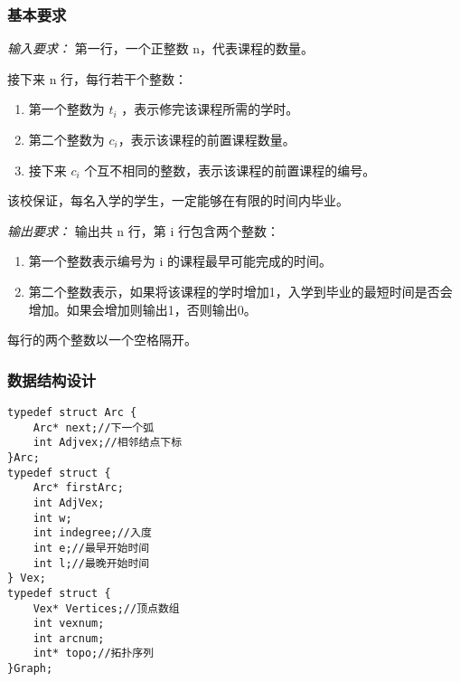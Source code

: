 \documentclass[a4paper,11pt]{article}%
\newenvironment{shadedquotation}
 {\begin{shaded*}
  \quoting[leftmargin=0pt, vskip=0pt]
 }
 {\endquoting
 \end{shaded*}
}
\begin{document}
\subsubsection{基本要求}
\begin{shadedquotation}
    \emph{输入要求：}
    第一行，一个正整数 n，代表课程的数量。

    接下来 n 行，每行若干个整数：
    \begin{enumerate}
        \item 第一个整数为 $t_i$ ，表示修完该课程所需的学时。
        \item 第二个整数为 $c_i$，表示该课程的前置课程数量。
        \item 接下来 $c_i$ 个互不相同的整数，表示该课程的前置课程的编号。
    \end{enumerate}
    该校保证，每名入学的学生，一定能够在有限的时间内毕业。
\end{shadedquotation}
\begin{shadedquotation}
    \emph{输出要求：}
    输出共 n 行，第 i 行包含两个整数：
    \begin{enumerate}
        \item 第一个整数表示编号为 i 的课程最早可能完成的时间。
        \item 第二个整数表示，如果将该课程的学时增加1，入学到毕业的最短时间是否会增加。如果会增加则输出1，否则输出0。
    \end{enumerate}
    每行的两个整数以一个空格隔开。
\end{shadedquotation}
\subsubsection{数据结构设计}
\begin{lstlisting}[language={[ANSI]C},keywordstyle=\color{blue!70},commentstyle=\color{red!50!green!50!blue!50},frame=shadowbox,
				rulesepcolor=\color{red!20!green!20!blue!20}]
typedef struct Arc {
	Arc* next;//下一个弧
	int Adjvex;//相邻结点下标
}Arc;
typedef struct {
	Arc* firstArc;
	int AdjVex;
	int w;
	int indegree;//入度
	int e;//最早开始时间
	int l;//最晚开始时间
} Vex;
typedef struct {
	Vex* Vertices;//顶点数组
	int vexnum;
	int arcnum;
	int* topo;//拓扑序列
}Graph;
\end{lstlisting}
\end{document}
